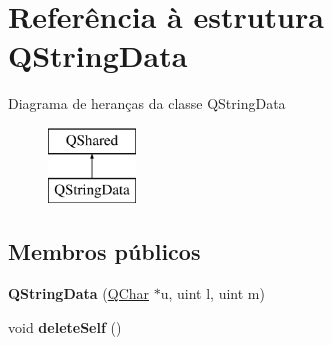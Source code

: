 \hypertarget{struct_q_string_data}{\section{Referência à estrutura Q\-String\-Data}
\label{struct_q_string_data}
}
Diagrama de heranças da classe Q\-String\-Data\begin{figure}[H]
\begin{center}
\leavevmode
\includegraphics[height=2.000000cm]{struct_q_string_data}
\end{center}
\end{figure}
\subsection*{Membros públicos}
\begin{DoxyCompactItemize}
\item 
\hypertarget{struct_q_string_data_a02ae7db3fae27290fb4847dafa061a61}{{\bfseries Q\-String\-Data} (\hyperlink{class_q_char}{Q\-Char} $\ast$u, uint l, uint m)}\label{struct_q_string_data_a02ae7db3fae27290fb4847dafa061a61}

\item 
\hypertarget{struct_q_string_data_ac3b4e50d1ca781a90c8e8aed5c6c373f}{void {\bfseries delete\-Self} ()}\label{struct_q_string_data_ac3b4e50d1ca781a90c8e8aed5c6c373f}

\end{DoxyCompactItemize}
